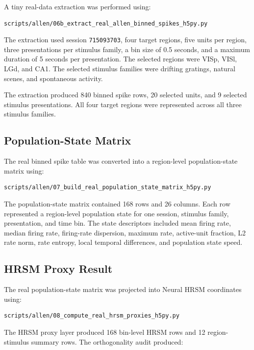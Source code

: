 A tiny real-data extraction was performed using:

\begin{verbatim}
scripts/allen/06b_extract_real_allen_binned_spikes_h5py.py
\end{verbatim}

The extraction used session \texttt{715093703}, four target regions, five units per region, three presentations per stimulus family, a bin size of 0.5 seconds, and a maximum duration of 5 seconds per presentation. The selected regions were VISp, VISl, LGd, and CA1. The selected stimulus families were drifting gratings, natural scenes, and spontaneous activity.

The extraction produced 840 binned spike rows, 20 selected units, and 9 selected stimulus presentations. All four target regions were represented across all three stimulus families.

\subsection{Population-State Matrix}

The real binned spike table was converted into a region-level population-state matrix using:

\begin{verbatim}
scripts/allen/07_build_real_population_state_matrix_h5py.py
\end{verbatim}

The population-state matrix contained 168 rows and 26 columns. Each row represented a region-level population state for one session, stimulus family, presentation, and time bin. The state descriptors included mean firing rate, median firing rate, firing-rate dispersion, maximum rate, active-unit fraction, L2 rate norm, rate entropy, local temporal differences, and population state speed.

\subsection{HRSM Proxy Result}

The real population-state matrix was projected into Neural HRSM coordinates using:

\begin{verbatim}
scripts/allen/08_compute_real_hrsm_proxies_h5py.py
\end{verbatim}

The HRSM proxy layer produced 168 bin-level HRSM rows and 12 region-stimulus summary rows. The orthogonality audit produced:

